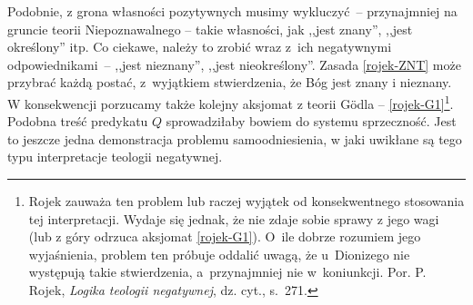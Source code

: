 Podobnie, z grona własności pozytywnych musimy
wykluczyć~-- przynajmniej na gruncie teorii Niepoznawalnego -- takie
własności, jak ,,jest znany'', ,,jest określony'' itp. Co ciekawe,
należy to zrobić wraz z~ich negatywnymi
odpowiednikami~-- ,,jest nieznany'', ,,jest nieokreślony''.
Zasada \ref{rojek-ZNT} może przybrać każdą postać, z~wyjątkiem stwierdzenia, że Bóg jest znany i nieznany.
W konsekwencji porzucamy także kolejny aksjomat z teorii Gödla -- \eqref{rojek-G1}\footnote{Rojek zauważa ten problem lub raczej wyjątek od konsekwentnego stosowania tej
interpretacji.
Wydaje się jednak, że nie zdaje sobie sprawy z jego wagi (lub z góry odrzuca aksjomat \eqref{rojek-G1}). O~ile dobrze rozumiem jego wyjaśnienia, problem ten próbuje oddalić uwagą, że u~Dionizego nie występują takie stwierdzenia,
a~przynajmniej nie w~koniunkcji. Por. P. Rojek, \textit{Logika teologii negatywnej}, dz. cyt., s.~271.}.
Podobna treść predykatu $Q$ sprowadziłaby bowiem do systemu sprzeczność.
Jest to jeszcze jedna demonstracja problemu samoodniesienia, w jaki uwikłane są tego typu interpretacje
teologii negatywnej.




